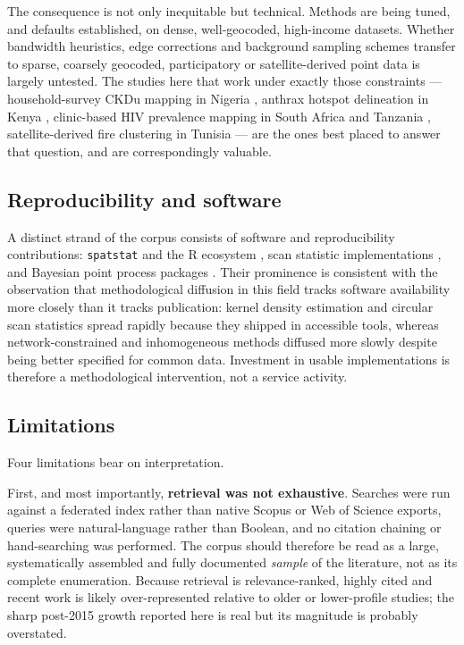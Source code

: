 \documentclass[11pt,a4paper]{article}
\begin{document}
The consequence is not only inequitable but technical. Methods are being
tuned, and defaults established, on dense, well-geocoded, high-income
datasets. Whether bandwidth heuristics, edge corrections and background
sampling schemes transfer to sparse, coarsely geocoded, participatory or
satellite-derived point data is largely untested. The studies here that work
under exactly those constraints --- household-survey CKDu mapping in Nigeria
\citep{babaganakyari2025}, anthrax hotspot delineation in Kenya
\citep{gachohi2022}, clinic-based HIV prevalence mapping in South Africa and
Tanzania \citep{cuadros2018}, satellite-derived fire clustering in Tunisia
\citep{mejri2026} --- are the ones best placed to answer that question, and
are correspondingly valuable.

\subsection{Reproducibility and software}
A distinct strand of the corpus consists of software and reproducibility
contributions: \texttt{spatstat} and the R ecosystem
\citep{baddeley2015,baddeley2026,gonzalez2023}, scan statistic implementations
\citep{otani2021}, and Bayesian point process packages
\citep{watson2024,palmiperales2025,naylor2023}. Their prominence is
consistent with the observation that methodological diffusion in this field
tracks software availability more closely than it tracks publication: kernel
density estimation and circular scan statistics spread rapidly because they
shipped in accessible tools, whereas network-constrained and inhomogeneous
methods diffused more slowly despite being better specified for common data.
Investment in usable implementations is therefore a methodological
intervention, not a service activity.

\subsection{Limitations}
\label{sec:limits}
Four limitations bear on interpretation.

First, and most importantly, \textbf{retrieval was not exhaustive}. Searches
were run against a federated index rather than native Scopus or Web of Science
exports, queries were natural-language rather than Boolean, and no citation
chaining or hand-searching was performed. The corpus should therefore be read
as a large, systematically assembled and fully documented \emph{sample} of the
literature, not as its complete enumeration. Because retrieval is
relevance-ranked, highly cited and recent work is likely over-represented
relative to older or lower-profile studies; the sharp post-2015 growth
reported here is real but its magnitude is probably overstated.
\end{document}
